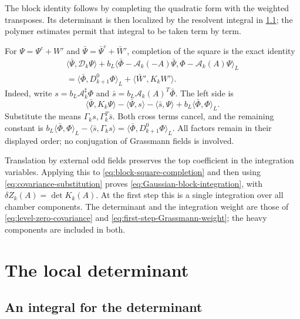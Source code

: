 The block identity follows by completing the quadratic form with the
weighted transposes. Its determinant is then localized by the
resolvent integral in \cref{subsec:determinant-integral}; the polymer
estimates permit that integral to be taken term by term.

For $\Psi=\Psi^c+W'$ and $\bar\Psi=\bar\Psi^c+\bar W'$,
completion of the square is the exact identity
\begin{multline}\label{eq:block-square-completion}
 \langle\bar\Psi,\mathcal D_k\Psi\rangle
   +b_L\langle\bar\Phi-\mathcal A_k(-A)\bar\Psi,
                    \Phi-\mathcal A_k(A)\Psi\rangle_L\\
   =\langle\bar\Phi,D_{k+1}^0\Phi\rangle_L
                    +\langle\bar W',K_kW'\rangle.
\end{multline}
Indeed, write $s=b_L\mathcal A_k^\sharp\Phi$ and
$\bar s=b_L\mathcal A_k(A)^T\bar\Phi$. The left side is
\[
 \langle\bar\Psi,K_k\Psi\rangle
      -\langle\bar\Psi,s\rangle-\langle\bar s,\Psi\rangle
      +b_L\langle\bar\Phi,\Phi\rangle_L.
\]
Substitute the means $\Gamma_ks,\Gamma_k^T\bar s$. Both cross
terms cancel, and the remaining constant is
$b_L\langle\bar\Phi,\Phi\rangle_L
-\langle\bar s,\Gamma_ks\rangle
=\langle\bar\Phi,D_{k+1}^0\Phi\rangle_L$.
All factors remain in their displayed order; no conjugation of
Grassmann fields is involved.

Translation by external odd fields preserves the top coefficient
in the integration variables. Applying this to
\eqref{eq:block-square-completion} and then using
\eqref{eq:covariance-substitution} proves
\eqref{eq:Gaussian-block-integration}, with $\delta Z_k(A)=\det K_k(A)$.
At the first step this is a single integration over all chamber
components. The determinant and the integration weight are those of
\eqref{eq:level-zero-covariance} and
\eqref{eq:first-step-Grassmann-weight}; the heavy components are
included in both.

\section{The local determinant}\label{sec:local-determinant}

\subsection{An integral for the determinant}\label{subsec:determinant-integral}

